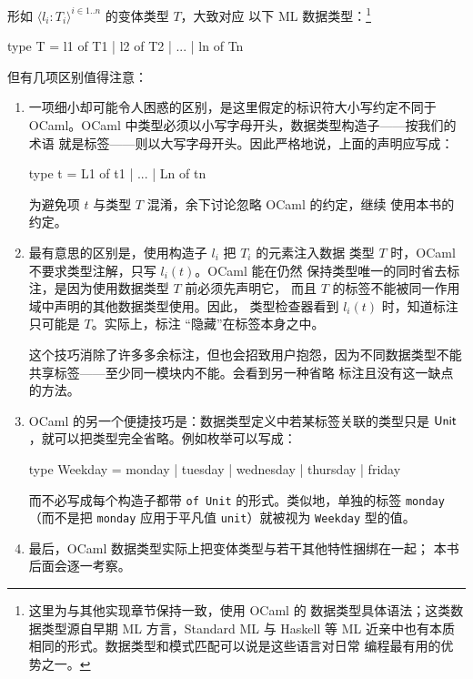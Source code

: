 形如 \(\langle l_i:T_i\rangle^{i\in1..n}\) 的变体类型 \(T\)，大致对应
以下 ML 数据类型：\footnote{这里为与其他实现章节保持一致，使用 OCaml 的
数据类型具体语法；这类数据类型源自早期 ML 方言，Standard ML 与 Haskell
等 ML 近亲中也有本质相同的形式。数据类型和模式匹配可以说是这些语言对日常
编程最有用的优势之一。}
\begin{taplocamlcode}
type T = l1 of T1
       | l2 of T2
       | ...
       | ln of Tn
\end{taplocamlcode}
但有几项区别值得注意：
\begin{enumerate}
  \item 一项细小却可能令人困惑的区别，是这里假定的标识符大小写约定不同于
    OCaml。OCaml 中类型必须以小写字母开头，数据类型构造子——按我们的术语
    就是标签——则以大写字母开头。因此严格地说，上面的声明应写成：
    \begin{taplocamlcode}
type t = L1 of t1 | ... | Ln of tn
    \end{taplocamlcode}
    \taplocamlsyntaxonly
    为避免项 \(t\) 与类型 \(T\) 混淆，余下讨论忽略 OCaml 的约定，继续
    使用本书的约定。

  \item 最有意思的区别是，使用构造子 \(l_i\) 把 \(T_i\) 的元素注入数据
    类型 \(T\) 时，OCaml 不要求类型注解，只写 \(l_i(t)\)。OCaml 能在仍然
    保持类型唯一的同时省去标注，是因为使用数据类型 \(T\) 前必须先声明它，
    而且 \(T\) 的标签不能被同一作用域中声明的其他数据类型使用。因此，
    类型检查器看到 \(l_i(t)\) 时，知道标注只可能是 \(T\)。实际上，标注
    “隐藏”在标签本身之中。

    这个技巧消除了许多多余标注，但也会招致用户抱怨，因为不同数据类型不能
    共享标签——至少同一模块内不能。会看到另一种省略
    标注且没有这一缺点的方法。

  \item OCaml 的另一个便捷技巧是：数据类型定义中若某标签关联的类型只是
    \(\mathsf{Unit}\)，就可以把类型完全省略。例如枚举可以写成：
    \begin{taplocamlcode}
type Weekday = monday | tuesday | wednesday | thursday | friday
    \end{taplocamlcode}
    而不必写成每个构造子都带 \texttt{of Unit} 的形式。类似地，单独的标签
    \texttt{monday}（而不是把 \texttt{monday} 应用于平凡值
    \texttt{unit}）就被视为 \texttt{Weekday} 型的值。

  \item 最后，OCaml 数据类型实际上把变体类型与若干其他特性捆绑在一起；
    本书后面会逐一考察。


\end{enumerate}
